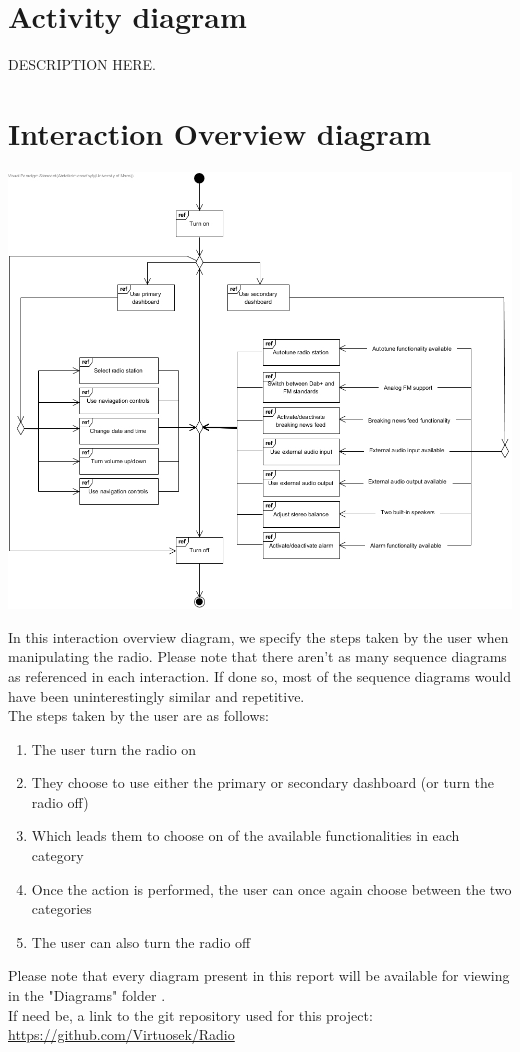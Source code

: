 \documentclass[11pt]{article}
\begin{document}
\pagebreak
\section{Activity diagram}
\vspace{10px}
\begin{center}
\end{center}
DESCRIPTION HERE.

\pagebreak
\section{Interaction Overview diagram}
\vspace{10px}
\begin{center}
\includegraphics[width=15cm]{../Diagrams/InteractionOverview-v2.jpg}\\
\end{center}
In this interaction overview diagram, we specify the steps taken by the user when manipulating the radio. Please note that there aren't as many sequence diagrams as referenced in each interaction. If done so, most of the sequence diagrams would have been uninterestingly similar and repetitive.\\
The steps taken by the user are as follows:
\begin{enumerate}
\item The user turn the radio on
\item They choose to use either the primary or secondary dashboard (or turn the radio off)
\item Which leads them to choose on of the available functionalities in each category
\item Once the action is performed, the user can once again choose between the two categories
\item The user can also turn the radio off
\end{enumerate}

\pagebreak
Please note that every diagram present in this report will be available for viewing in the "Diagrams" folder .\\
If need be, a link to the git repository used for this project:\\
\url{https://github.com/Virtuosek/Radio}
\end{document}
